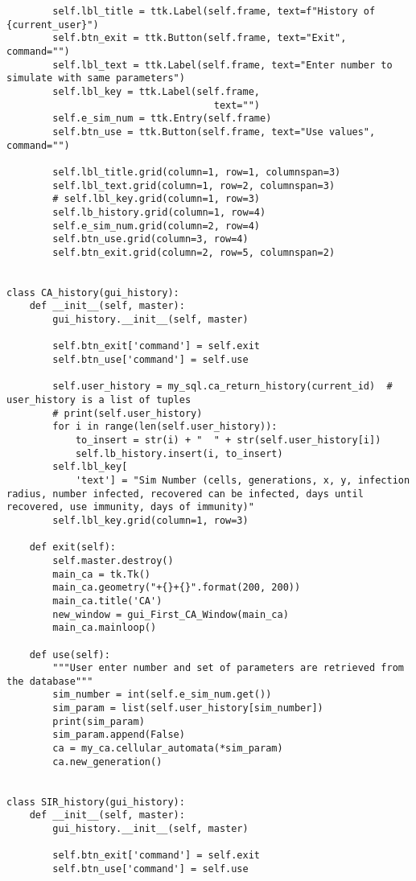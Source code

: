 \documentclass[11pt, a4paper]{article}
\begin{document}
\begin{lstlisting}
        self.lbl_title = ttk.Label(self.frame, text=f"History of {current_user}")
        self.btn_exit = ttk.Button(self.frame, text="Exit", command="")
        self.lbl_text = ttk.Label(self.frame, text="Enter number to simulate with same parameters")
        self.lbl_key = ttk.Label(self.frame,
                                    text="")
        self.e_sim_num = ttk.Entry(self.frame)
        self.btn_use = ttk.Button(self.frame, text="Use values", command="")

        self.lbl_title.grid(column=1, row=1, columnspan=3)
        self.lbl_text.grid(column=1, row=2, columnspan=3)
        # self.lbl_key.grid(column=1, row=3)
        self.lb_history.grid(column=1, row=4)
        self.e_sim_num.grid(column=2, row=4)
        self.btn_use.grid(column=3, row=4)
        self.btn_exit.grid(column=2, row=5, columnspan=2)


class CA_history(gui_history):
    def __init__(self, master):
        gui_history.__init__(self, master)

        self.btn_exit['command'] = self.exit
        self.btn_use['command'] = self.use

        self.user_history = my_sql.ca_return_history(current_id)  # user_history is a list of tuples
        # print(self.user_history)
        for i in range(len(self.user_history)):
            to_insert = str(i) + "  " + str(self.user_history[i])
            self.lb_history.insert(i, to_insert)
        self.lbl_key[
            'text'] = "Sim Number (cells, generations, x, y, infection radius, number infected, recovered can be infected, days until recovered, use immunity, days of immunity)"
        self.lbl_key.grid(column=1, row=3)

    def exit(self):
        self.master.destroy()
        main_ca = tk.Tk()
        main_ca.geometry("+{}+{}".format(200, 200))
        main_ca.title('CA')
        new_window = gui_First_CA_Window(main_ca)
        main_ca.mainloop()

    def use(self):
        """User enter number and set of parameters are retrieved from the database"""
        sim_number = int(self.e_sim_num.get())
        sim_param = list(self.user_history[sim_number])
        print(sim_param)
        sim_param.append(False)
        ca = my_ca.cellular_automata(*sim_param)
        ca.new_generation()


class SIR_history(gui_history):
    def __init__(self, master):
        gui_history.__init__(self, master)

        self.btn_exit['command'] = self.exit
        self.btn_use['command'] = self.use


\end{lstlisting}
\end{document}
